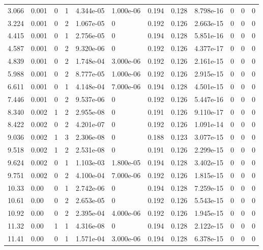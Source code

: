 \documentclass[preview]{standalone}
\begin{document}
{{\begin{tabular}{L{1.2cm}C{1.2cm} C{0.3cm}C{0.5cm} C{1.4cm}C{1.4cm} C{1.4cm}C{1.4cm} C{1.6cm}C{1.6cm} C{1.6cm}C{1.6cm}}
  3.066  &  0.001  & 0     &  1 &  4.344e-05  & 1.000e-06  &  0.194&   0.128& 8.798e-16 & 0   &  0 & 0  \\ 
  3.224  &  0.001  & 0     &  2 &  1.067e-05  & 0  &  0.192&   0.126& 2.663e-15 & 0   &  0 & 0  \\ 
  4.415  &  0.001  & 0     &  1 &  2.756e-05  & 0  &  0.194&   0.128& 5.851e-16 & 0   &  0 & 0  \\ 
  4.587  &  0.001  & 0     &  2 &  9.320e-06  & 0  &  0.192&   0.126& 4.377e-17 & 0   &  0 & 0  \\ 
  4.839  &  0.001  & 0     &  2 &  1.748e-04  & 3.000e-06  &  0.192&   0.126& 2.161e-15 & 0   &  0 & 0  \\ 
  5.988  &  0.001  & 0     &  2 &  8.777e-05  & 1.000e-06  &  0.192&   0.126& 2.915e-15 & 0   &  0 & 0  \\ 
  6.611  &  0.001  & 0     &  1 &  4.148e-04  & 7.000e-06  &  0.194&   0.128& 4.501e-15 & 0   &  0 & 0  \\ 
  7.446  &  0.001  & 0     &  2 &  9.537e-06  & 0  &  0.192&   0.126& 5.447e-16 & 0   &  0 & 0  \\ 
  8.340  &  0.002  & 1     &  2 &  2.955e-08  & 0  &  0.191&   0.126& 9.110e-17 & 0   &  0 & 0  \\ 
  8.422  &  0.002  & 0     &  2 &  4.201e-07  & 0  &  0.192&   0.126& 1.091e-14 & 0   &  0 & 0  \\ 
  9.036  &  0.002  & 1     &  3 &  2.306e-08  & 0  &  0.188&   0.123& 3.077e-15 & 0   &  0 & 0  \\ 
  9.518  &  0.002  & 1     &  2 &  2.531e-08  & 0  &  0.191&   0.126& 2.299e-15 & 0   &  0 & 0  \\ 
  9.624  &  0.002  & 0     &  1 &  1.103e-03  & 1.800e-05  &  0.194&   0.128& 3.402e-15 & 0   &  0 & 0  \\ 
  9.751  &  0.002  & 0     &  2 &  4.100e-04  & 7.000e-06  &  0.192&   0.126& 1.815e-15 & 0   &  0 & 0  \\ 
  10.33  &  0.00  & 0     &  1 &  2.742e-06  & 0  &  0.194&   0.128& 7.259e-15 & 0   &  0 & 0  \\ 
  10.61  &  0.00  & 0     &  2 &  2.653e-05  & 0  &  0.192&   0.126& 5.543e-15 & 0   &  0 & 0  \\ 
  10.92  &  0.00  & 0     &  2 &  2.395e-04  & 4.000e-06  &  0.192&   0.126& 1.945e-15 & 0   &  0 & 0  \\ 
  11.32  &  0.00  & 1     &  1 &  4.316e-08  & 0  &  0.194&   0.128& 2.122e-15 & 0   &  0 & 0  \\ 
  11.41  &  0.00  & 0     &  1 &  1.571e-04  & 3.000e-06  &  0.194&   0.128& 6.378e-15 & 0   &  0 & 0  \\ 

\end{tabular}}}
\end{document}
